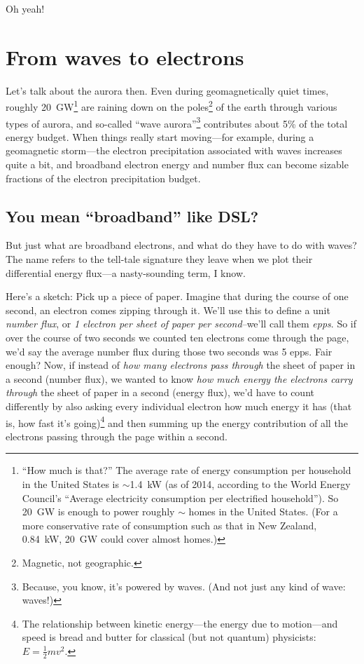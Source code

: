Oh yeah!

\section{From waves to electrons}

Let's talk about the aurora then. Even during geomagnetically quiet times,
roughly 20~GW\footnote{``How much is that?'' The average rate of energy
  consumption per household in the United States is $\sim$1.4~kW (as of 2014,
  according to the World Energy Council's ``Average electricity consumption per
  electrified household''). So 20~GW is enough to power roughly
  $\sim$ homes in the United States. (For a more conservative
  rate of consumption such as that in New Zealand, 0.84~kW, 20~GW could cover
  almost  homes.)} \citep{Newell2009} are raining down on the
poles\footnote{Magnetic, not geographic.} of the earth through various types of
aurora, and so-called ``wave aurora''\footnote{Because, you know, it's powered
  by waves. (And not just any kind of wave: \Alf waves!)} contributes about 5\%
of the total energy budget. When things really start moving---for example,
during a geomagnetic storm---the electron precipitation associated with \Alf
waves increases quite a bit, and broadband electron energy and number flux can
become sizable fractions of the electron precipitation budget.

\subsection{You mean ``broadband'' like DSL?}

But just what are broadband electrons, and what do they have to do with \Alf
waves? The name refers to the tell-tale signature they leave when we plot their
differential energy flux---a nasty-sounding term, I know.

Here's a sketch: Pick up a piece of paper. Imagine that during the course of one
second, an electron comes zipping through it. We'll use this to define a unit
\emph{number flux}, or \emph {1 electron per sheet of paper per second}--we'll
call them \emph{epps}. So if over the course of two seconds we counted ten
electrons come through the page, we'd say the average number flux during those
two seconds was 5 epps. Fair enough?  Now, if instead of \emph{how many
  electrons pass through} the sheet of paper in a second (number flux), we
wanted to know \emph{how much energy the electrons carry through} the sheet of
paper in a second (energy flux), we'd have to count differently by also asking
every individual electron how much energy it has (that is, how fast it's
going)\footnote{The relationship between kinetic energy---the energy due to
  motion---and speed is bread and butter for classical (but not quantum)
  physicists: $E = \frac{1}{2}m v^2.$} and then summing up the energy
contribution of all the electrons passing through the page within a second.

